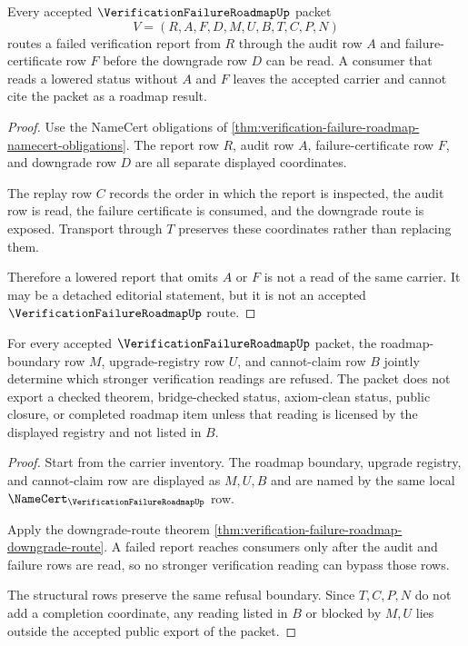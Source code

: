 \begin{theorem}
\label{thm:verification-failure-roadmap-downgrade-route}
Every accepted $\VerificationFailureRoadmapUp$ packet
$$
V=(R,A,F,D,M,U,B,T,C,P,N)
$$
routes a failed verification report from $R$ through the audit row $A$ and failure-certificate row $F$ before the downgrade row $D$ can be read. A consumer that reads a lowered status without $A$ and $F$ leaves the accepted carrier and cannot cite the packet as a roadmap result.
\end{theorem}
\begin{proof}
Use the NameCert obligations of \autoref{thm:verification-failure-roadmap-namecert-obligations}. The report row $R$, audit row $A$, failure-certificate row $F$, and downgrade row $D$ are all separate displayed coordinates.

The replay row $C$ records the order in which the report is inspected, the audit row is read, the failure certificate is consumed, and the downgrade route is exposed. Transport through $T$ preserves these coordinates rather than replacing them.

Therefore a lowered report that omits $A$ or $F$ is not a read of the same carrier. It may be a detached editorial statement, but it is not an accepted $\VerificationFailureRoadmapUp$ route.
\end{proof}

\begin{theorem}
\label{thm:verification-failure-roadmap-nonclaim-boundary}
For every accepted $\VerificationFailureRoadmapUp$ packet, the roadmap-boundary row $M$, upgrade-registry row $U$, and cannot-claim row $B$ jointly determine which stronger verification readings are refused. The packet does not export a checked theorem, bridge-checked status, axiom-clean status, public closure, or completed roadmap item unless that reading is licensed by the displayed registry and not listed in $B$.
\end{theorem}
\begin{proof}
Start from the carrier inventory. The roadmap boundary, upgrade registry, and cannot-claim row are displayed as $M,U,B$ and are named by the same local $\NameCert_{\VerificationFailureRoadmapUp}$ row.

Apply the downgrade-route theorem \autoref{thm:verification-failure-roadmap-downgrade-route}. A failed report reaches consumers only after the audit and failure rows are read, so no stronger verification reading can bypass those rows.

The structural rows preserve the same refusal boundary. Since $T,C,P,N$ do not add a completion coordinate, any reading listed in $B$ or blocked by $M,U$ lies outside the accepted public export of the packet.
\end{proof}

